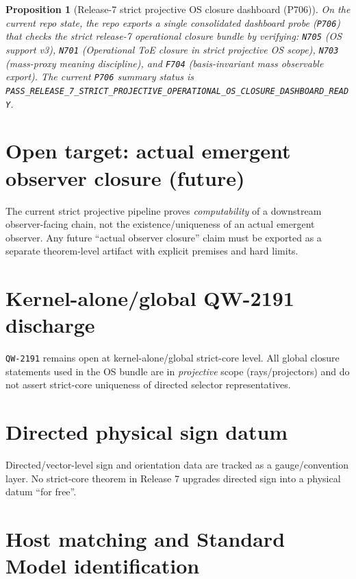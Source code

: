 \documentclass[11pt,a4paper]{article}
\makeatletter
\newtheorem{proposition}[theorem]{Proposition}
\newcommand{\chapter}{\@ifstar{\section*}{\section}}
\makeatother
\begin{document}
\begin{proposition}[Release-7 strict projective OS closure dashboard (P706)]
On the current repo state, the repo exports a single consolidated dashboard probe (\texttt{P706}) that checks the strict release-7 operational closure bundle by verifying:
\texttt{N705} (OS support v3), \texttt{N701} (Operational ToE closure in strict projective OS scope), \texttt{N703} (mass-proxy meaning discipline), and \texttt{F704} (basis-invariant mass observable export).
The current \texttt{P706} summary status is \texttt{PASS\_RELEASE\_7\_STRICT\_PROJECTIVE\_OPERATIONAL\_OS\_CLOSURE\_DASHBOARD\_READY}.
\end{proposition}
\section{Open target: actual emergent observer closure (future)}

The current strict projective pipeline proves \emph{computability} of a downstream observer-facing chain, not the existence/uniqueness of an actual emergent observer.
Any future “actual observer closure” claim must be exported as a separate theorem-level artifact with explicit premises and hard limits.

\chapter{Hard limits and open problems}
\section{Kernel-alone/global QW-2191 discharge}

\texttt{QW-2191} remains open at kernel-alone/global strict-core level.
All global closure statements used in the OS bundle are in \emph{projective} scope (rays/projectors) and do not assert strict-core uniqueness of directed selector representatives.
\section{Directed physical sign datum}

Directed/vector-level sign and orientation data are tracked as a gauge/convention layer.
No strict-core theorem in Release 7 upgrades directed sign into a physical datum “for free”.
\section{Host matching and Standard Model identification}
\end{document}
